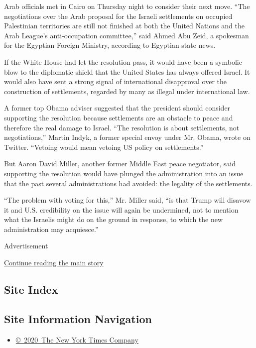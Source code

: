 Arab officials met in Cairo on Thursday night to consider their next
move. ``The negotiations over the Arab proposal for the Israeli
settlements on occupied Palestinian territories are still not finished
at both the United Nations and the Arab League's anti-occupation
committee,'' said Ahmed Abu Zeid, a spokesman for the Egyptian Foreign
Ministry, according to Egyptian state news.

If the White House had let the resolution pass, it would have been a
symbolic blow to the diplomatic shield that the United States has always
offered Israel. It would also have sent a strong signal of international
disapproval over the construction of settlements, regarded by many as
illegal under international law.

A former top Obama adviser suggested that the president should consider
supporting the resolution because settlements are an obstacle to peace
and therefore the real damage to Israel. ``The resolution is about
settlements, not negotiations,'' Martin Indyk, a former special envoy
under Mr. Obama, wrote on Twitter. ``Vetoing would mean vetoing US
policy on settlements.''

But Aaron David Miller, another former Middle East peace negotiator,
said supporting the resolution would have plunged the administration
into an issue that the past several administrations had avoided: the
legality of the settlements.

``The problem with voting for this,'' Mr. Miller said, ``is that Trump
will disavow it and U.S. credibility on the issue will again be
undermined, not to mention what the Israelis might do on the ground in
response, to which the new administration may acquiesce.''

Advertisement

\protect\hyperlink{after-bottom}{Continue reading the main story}

\hypertarget{site-index}{%
\subsection{Site Index}\label{site-index}}

\hypertarget{site-information-navigation}{%
\subsection{Site Information
Navigation}\label{site-information-navigation}}

\begin{itemize}
\tightlist
\item
  \href{https://help.nytimes.com/hc/en-us/articles/115014792127-Copyright-notice}{©~2020~The
  New York Times Company}
\end{itemize}

